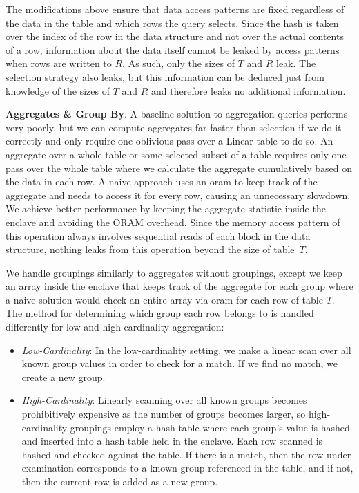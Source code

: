 \documentclass[letterpaper,twocolumn,10pt]{article}
\begin{document}
\begin{itemize}[itemsep=0pt,parsep=0pt]
The modifications above ensure that data access patterns are fixed regardless of the data in the table and which rows the query selects. Since the hash is taken over the index of the row in the data structure and not over the actual contents of a row, information about the data itself cannot be leaked by access patterns when rows are written to $R$. As such, only the sizes of $T$ and $R$ leak. The selection strategy also leaks, but this information can be deduced just from knowledge of the sizes of $T$ and $R$ and therefore leaks no additional information.
\end{itemize}

  \noindent \textbf{Aggregates \& Group By}. 
A baseline solution to aggregation queries performs very poorly, but we can compute aggregates far faster than selection if we do it correctly and only require one oblivious pass over a Linear table to do so.  An aggregate over a whole table or some selected subset of a table requires only one pass over the whole table where we calculate the aggregate cumulatively based on the data in each row. A naive approach uses an oram to keep track of the aggregate and needs to access it for every row, causing an unnecessary slowdown. We achieve better performance by keeping the aggregate statistic inside the enclave and avoiding the ORAM overhead. Since the memory access pattern of this operation always involves sequential reads of each block in the data structure, nothing leaks from this operation beyond the size of table~$T$. 

We handle groupings similarly to aggregates without groupings, except we keep an array inside the enclave that keeps track of the aggregate for each group where a naive solution would check an entire array via oram for each row of table $T$. The method for determining which group each row belongs to is handled differently for low and high-cardinality aggregation:
\begin{itemize}[itemsep=0pt,parsep=0pt]
\item \textit{Low-Cardinality}: In the low-cardinality setting, we make a linear scan over all known group values in order to check for a match. If we find no match, we create a new group. 

\item \textit{High-Cardinality}: Linearly scanning over all known groups becomes prohibitively expensive as the number of groups becomes larger, so high-cardinality groupings employ a hash table where each group's value is hashed and inserted into a hash table held in the enclave. Each row scanned is hashed and checked against the table. If there is a match, then the row under examination corresponds to a known group referenced in the table, and if not, then the current row is added as a new group. 

\end{itemize}
\end{document}
